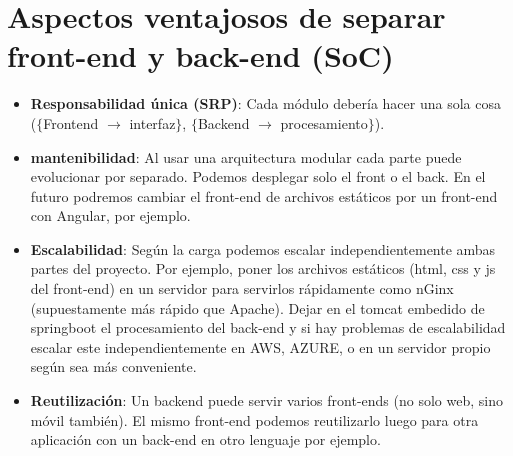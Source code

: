 \documentclass[a4paper,12pt]{report}
\begin{document}
		\section{Aspectos ventajosos de separar front-end y back-end (SoC)}
		\label{sec:SoCVENTATJES}
			\begin{itemize}
			\setlength{\itemsep}{.0em}
			\item \textbf{Responsabilidad única (SRP)}: Cada módulo debería hacer una sola cosa ($\{$Frontend $\rightarrow$ interfaz$\}$, $\{$Backend $\rightarrow$ procesamiento$\}$). 
			\item \textbf{mantenibilidad}: Al usar una arquitectura modular cada parte puede evolucionar por separado. Podemos desplegar solo el front o el back. En el futuro podremos cambiar el front-end de archivos estáticos por un front-end con Angular, por ejemplo.
			\item \textbf{Escalabilidad}: Según la carga podemos escalar independientemente ambas partes del proyecto. Por ejemplo, poner los archivos estáticos (html, css y js del front-end) en un servidor para servirlos rápidamente como nGinx \cite{nginx} (supuestamente más rápido que Apache). Dejar en el tomcat embedido de springboot el procesamiento del back-end y si hay problemas de escalabilidad escalar este independientemente en AWS, AZURE, o en un servidor propio según sea más conveniente.
			\item \textbf{Reutilización}: Un backend puede servir varios front-ends (no solo web, sino móvil también). El mismo front-end podemos reutilizarlo luego para otra aplicación con un back-end en otro lenguaje por ejemplo.
		\end{itemize}
		
		
		
	
		
	

	\endgroup
\end{document}
